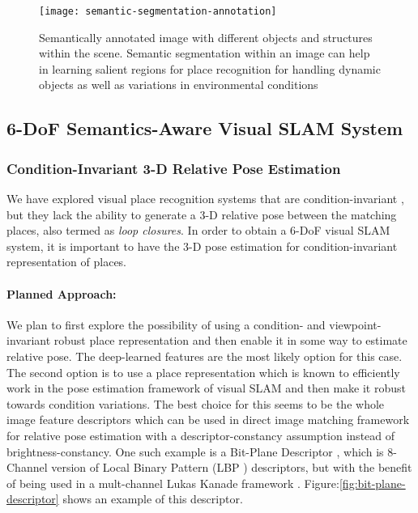 \documentclass{article}
\begin{document}
\begin{figure}[htbp]
 \centering
 \texttt{[image: semantic-segmentation-annotation]}
 \caption{Semantically annotated image \cite{mottaghi2014role} with different objects and structures within the scene. Semantic segmentation within an image can help in learning salient regions for place recognition for handling dynamic objects as well as variations in environmental conditions}
 \label{fig:semantic-within-example}
\end{figure}

\subsection{6-DoF Semantics-Aware Visual SLAM System}

\subsubsection{Condition-Invariant 3-D Relative Pose Estimation}
We have explored visual place recognition systems that are condition-invariant \cite{Milford2012,Niko2015,chen2017deep}, but they lack the ability to generate a 3-D relative pose between the matching places, also termed as \emph{loop closures}. In order to obtain a 6-DoF visual SLAM system, it is important to have the 3-D pose estimation for condition-invariant representation of places.

\paragraph{Planned Approach:}
We plan to first explore the possibility of using a condition- and viewpoint-invariant robust place representation and then enable it in some way to estimate relative pose. The deep-learned features are the most likely option for this case. The second option is to use a place representation which is known to efficiently work in the pose estimation framework of visual SLAM and then make it robust towards condition variations. The best choice for this seems to be the whole image feature descriptors which can be used in direct image matching framework for relative pose estimation with a descriptor-constancy assumption instead of brightness-constancy. One such example is a Bit-Plane Descriptor \cite{alismail2016bit}, which is 8-Channel version of Local Binary Pattern (LBP \cite{ojala1996comparative}) descriptors, but with the benefit of being used in a mult-channel Lukas Kanade framework \cite{alismail2016bit}. Figure:\ref{fig:bit-plane-descriptor} shows an example of this descriptor.
\end{document}
